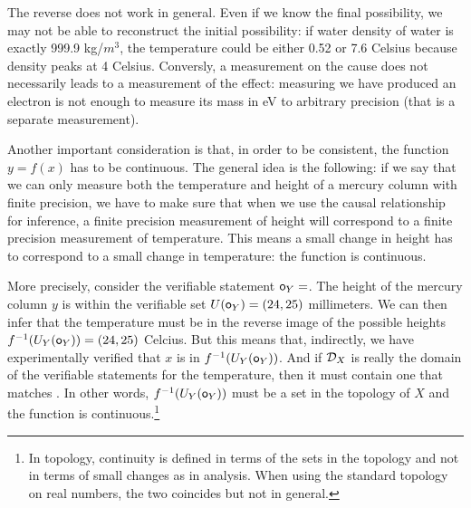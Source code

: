 \documentclass[11pt,letterpaper,fleqn]{memoir} %
\begin{document}
The reverse does not work in general. Even if we know the final possibility, we may not be able to reconstruct the initial possibility: if water density of water is exactly 999.9 kg/$m^3$, the temperature could be either 0.52 or 7.6 Celsius because density peaks at 4 Celsius. Conversly, a measurement on the cause does not necessarily leads to a measurement of the effect: measuring we have produced an electron is not enough to measure its mass in eV to arbitrary precision (that is a separate measurement).

Another important consideration is that, in order to be consistent, the function $y=f(x)$ has to be continuous. The general idea is the following: if we say that we can only measure both the temperature and height of a mercury column with finite precision, we have to make sure that when we use the causal relationship for inference, a finite precision measurement of height will correspond to a finite precision measurement of temperature. This means a small change in height has to correspond to a small change in temperature: the function is continuous.

More precisely, consider the verifiable statement $\mathsf{o}_Y=$. The height of the mercury column $y$ is within the verifiable set $U(\mathsf{o}_Y) = (24, 25)$ millimeters. We can then infer that the temperature must be in the reverse image of the possible heights $f^{-1}(U_Y(\mathsf{o}_Y))=(24,25)$ Celcius. But this means that, indirectly, we have experimentally verified that $x$ is in $f^{-1}(U_Y(\mathsf{o}_Y))$. And if $\mathcal{D}_X$ is really the domain of the verifiable statements for the temperature, then it must contain one that matches . In other words, $f^{-1}(U_Y(\mathsf{o}_Y))$ must be a set in the topology of $X$ and the function is continuous.\footnote{In topology, continuity is defined in terms of the sets in the topology and not in terms of small changes as in analysis. When using the standard topology on real numbers, the two coincides but not in general.}
\end{document}
